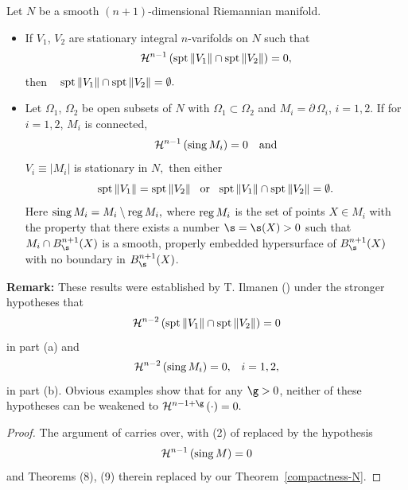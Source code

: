\documentclass[a4paper,11pt]{amsart}
\begin{document}
\begin{theorem}\label{maxm}
Let $N$ be a smooth $(n+1)$-dimensional Riemannian manifold.
\begin{itemize}
\item[(a)] If $V_{1}$, $V_{2}$ are stationary integral $n$-varifolds on $N$ such that 
$${\mathcal H}^{n-1} \, ({\rm spt} \, \|V_{1}\| \cap {\rm spt} \, \|V_{2}\|) = 0,$$
then $\;\;\; {\rm spt} \, \|V_{1}\| \cap {\rm spt} \, \|V_{2}\|= \emptyset.$
\item[(b)] Let $\Omega_{1}$, $\Omega_{2}$ be open subsets of $N$ with $\Omega_{1} \subset \Omega_{2}$ and $M_{i} = \partial \, \Omega_{i}$, $i=1, 2.$ 
If for $i=1, 2$, $M_{i}$ is connected,  
$${\mathcal H}^{n-1} \, ({\rm sing} \, M_{i}) = 0 \, \;\;\; {\rm and}$$
$V_{i} \equiv |M_{i}|$ is stationary in $N,$ 
then either 
$${\rm spt} \, \|V_{1}\| = {\rm spt} \, \|V_{2}\| \;\;\; {\rm or} \;\;\; {\rm spt} \, \|V_{1}\| \cap {\rm spt} \, \|V_{2}\| = \emptyset.$$ 
Here ${\rm sing} \, M_{i} = M_{i} \setminus {\rm reg} \, M_{i},$ where ${\rm reg} \, M_{i}$ is the set of points $X \in M_{i}$ with the property that there exists a number 
$\s = \s(X) >0$ such that $M_{i} \cap B^{n+1}_{\s}(X)$ is a smooth, properly embedded hypersurface of $B_{\s}^{n+1}(X)$
with no boundary in $B_{\s}^{n+1}(X)$.
\end{itemize}
\end{theorem}



\noindent
{\bf Remark:} These results were established by T. Ilmanen (\cite{I}) under the stronger hypotheses that
$${\mathcal H}^{n-2} \, ({\rm spt} \, \|V_{1}\| \cap {\rm spt} \, \|V_{2}\|) = 0$$ 
\noindent
in part (a) and 
$${\mathcal H}^{n-2} \, ({\rm sing} \, M_{i}) = 0, \;\;\; i=1, 2,$$ 
\noindent
in part (b). Obvious examples show that for any $\g > 0$, neither of these hypotheses can be weakened to 
${\mathcal H}^{n-1+\g} \, (\cdot) = 0.$ 

\begin{proof}
The argument of \cite{I} carries over, with (2) of \cite{I} replaced by the hypothesis 
$${\mathcal H}^{n-1} \, ({\rm sing} \, M) = 0$$ 
\noindent
and  Theorems (8), (9) therein replaced by our Theorem~\ref{compactness-N}.
\end{proof}
\end{document}
